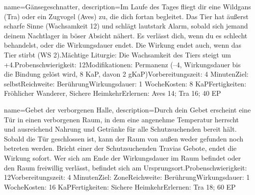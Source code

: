 {
    name={Gänsegeschnatter},
    description={Im Laufe des Tages fliegt dir eine Wildgans (Tra) oder ein Zugvogel (Aves) zu, die dich fortan begleitet. Das Tier hat äußerst scharfe Sinne (Wachsamkeit 12) und schlägt lautstark Alarm, sobald sich jemand deinem Nachtlager in böser Absicht nähert. Es verlässt dich, wenn du es schlecht behandelst, oder die Wirkungsdauer endet. Die Wirkung endet auch, wenn das Tier stirbt (WS 2).\newline Mächtige Liturgie: Die Wachsamkeit des Tiers steigt um +4.\newline Probenschwierigkeit: 12\newline Modifikationen: Permanenz (–4, Wirkungsdauer bis die Bindung gelöst wird, 8 KaP, davon 2 gKaP)\newline Vorbereitungszeit: 4 Minuten\newline Ziel: selbst\newline Reichweite: Berührung\newline Wirkungsdauer: 1 Woche\newline Kosten: 8 KaP\newline Fertigkeiten: Fröhlicher Wanderer, Sichere Heimkehr\newline Erlernen: Aves 14; Tra 16; 40 EP}
}


{
    name={Gebet der verborgenen Halle},
    description={Durch dein Gebet erscheint eine Tür in einen verborgenen Raum, in dem eine angenehme Temperatur herrscht und ausreichend Nahrung und Getränke für alle Schutzsuchenden bereit hält. Sobald die Tür geschlossen ist, kann der Raum von außen weder gefunden noch betreten werden. Bricht einer der Schutzsuchenden Travias Gebote, endet die Wirkung sofort. Wer sich am Ende der Wirkungsdauer im Raum befindet oder den Raum freiwillig verlässt, befindet sich am Ursprungsort.\newline Probenschwierigkeit: 12\newline Vorbereitungszeit: 4 Minuten\newline Ziel: Zone\newline Reichweite: Berührung\newline Wirkungsdauer: 1 Woche\newline Kosten: 16 KaP\newline Fertigkeiten: Sichere Heimkehr\newline Erlernen: Tra 18; 60 EP}
}


